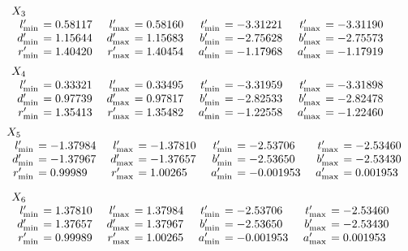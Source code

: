 \begin{small}
$$
\begin{array}{rlrlrlrl}
\noalign{\noindent 
$X_3$}
\noalign{\vskip2pt} l'_{\rm min} &\hskip-6pt =   0.58117&\enspace   l'_{\rm max} &\hskip-6pt =   0.58160&\enspace  
t'_{\rm min} &\hskip-6pt =   -3.31221&\enspace   t'_{\rm max} &\hskip-6pt =   -3.31190\\
d'_{\rm min} &\hskip-6pt =   1.15644& d'_{\rm max}
&\hskip-6pt =   1.15683&  b'_{\rm min} &\hskip-6pt =   -2.75628& b'_{\rm max} &\hskip-6pt =   -2.75573\\
r'_{\rm min} &\hskip-6pt =   1.40420&
r'_{\rm max} &\hskip-6pt =   1.40454&  a'_{\rm min} &\hskip-6pt =   -1.17968& a'_{\rm max} &\hskip-6pt =   -1.17919
\end{array}
$$
$$
\begin{array}{rlrlrlrl}
\noalign{\noindent 
$X_4$}
\noalign{\vskip2pt}
l'_{\rm min} &\hskip-6pt = 0.33321&\enspace   l'_{\rm max} &\hskip-6pt = 0.33495&\enspace  
t'_{\rm min} &\hskip-6pt = -3.31959&\enspace   t'_{\rm max}&\hskip-6pt = -3.31898\\
d'_{\rm min} &\hskip-6pt = 0.97739& d'_{\rm max}
&\hskip-6pt = 0.97817&  b'_{\rm min} &\hskip-6pt = -2.82533& b'_{\rm max} &\hskip-6pt = -2.82478\\
r'_{\rm min} &\hskip-6pt = 1.35413&
r'_{\rm max} &\hskip-6pt = 1.35482&  a'_{\rm min} &\hskip-6pt = -1.22558& a'_{\rm max} &\hskip-6pt = -1.22460\end{array}$$
$$\begin{array}{rlrlrlrl}
\noalign{\noindent 
$X_5$}
\noalign{\vskip2pt}
l'_{\rm min} &\hskip-6pt = -1.37984&\enspace   l'_{\rm max}&\hskip-6pt = -1.37810&\enspace  
t'_{\rm min} &\hskip-6pt = -2.53706&\enspace   t'_{\rm max} &\hskip-6pt = -2.53460\\
d'_{\rm min} &\hskip-6pt = -1.37967& d'_{\rm max}
&\hskip-6pt = -1.37657&  b'_{\rm min}&\hskip-6pt = -2.53650& b'_{\rm max} &\hskip-6pt = -2.53430\\
r'_{\rm min} &\hskip-6pt = 0.99989&
r'_{\rm max} &\hskip-6pt = 1.00265&  a'_{\rm min} &\hskip-6pt = -0.001953& a'_{\rm max} &\hskip-6pt = 0.001953\end{array}$$

$$\begin{array}{rlrlrlrl}
\noalign{\noindent 
$X_6$}
\noalign{\vskip2pt}
l'_{\rm min} &\hskip-6pt = 1.37810&\enspace   l'_{\rm max}&\hskip-6pt = 1.37984&\enspace  
t'_{\rm min} &\hskip-6pt = -2.53706&\enspace   t'_{\rm max} &\hskip-6pt = -2.53460\\
d'_{\rm min} &\hskip-6pt = 1.37657& d'_{\rm max}
&\hskip-6pt = 1.37967& b'_{\rm min} &\hskip-6pt = -2.53650& b'_{\rm max}&\hskip-6pt = -2.53430\\
r'_{\rm min} &\hskip-6pt = 0.99989&
r'_{\rm max} &\hskip-6pt = 1.00265&  a'_{\rm min} &\hskip-6pt = -0.001953& a'_{\rm max} &\hskip-6pt = 0.001953
\end{array}$$
\end{small}

